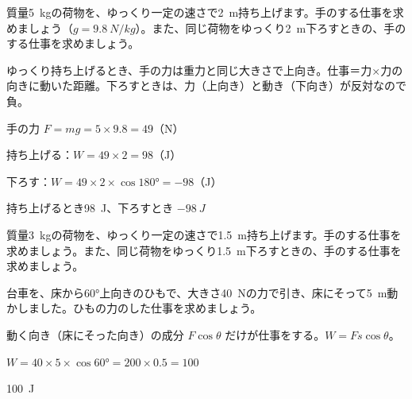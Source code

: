 \begin{kotoba}
\small
{}
\end{kotoba}


\begin{reidai}[持ち上げる仕事]
質量\qty{5}{kg}の荷物を、ゆっくり一定の速さで\qty{2}{m}持ち上げます。手のする仕事を求めましょう（$g=\qty{9.8}{N/kg}$）。また、同じ荷物をゆっくり\qty{2}{m}下ろすときの、手のする仕事を求めましょう。\par
\kangaekata ゆっくり持ち上げるとき、手の力は重力と同じ大きさで上向き。仕事＝力×力の向きに動いた距離。下ろすときは、力（上向き）と動き（下向き）が反対なので負。\par
\shiki 手の力 $F=mg=5\times9.8=49$（N）\par
\hspace*{2.6\zw}持ち上げる：$W=49\times2=98$（J）\par
\hspace*{2.6\zw}下ろす：$W=49\times2\times\cos180°=-98$（J）\par
\kotae 持ち上げるとき\qty{98}{J}、下ろすとき $-\qty{98}{J}$
\end{reidai}

\begin{jibun}
質量\qty{3}{kg}の荷物を、ゆっくり一定の速さで\qty{1.5}{m}持ち上げます。手のする仕事を求めましょう。また、同じ荷物をゆっくり\qty{1.5}{m}下ろすときの、手のする仕事を求めましょう。
\end{jibun}

\begin{reidai}[ななめに引く力の仕事]
台車を、床から60°上向きのひもで、大きさ\qty{40}{N}の力で引き、床にそって\qty{5}{m}動かしました。ひもの力のした仕事を求めましょう。\par
\kangaekata 動く向き（床にそった向き）の成分 $F\cos\theta$ だけが仕事をする。$W=Fs\cos\theta$。\par
\shiki $W=40\times5\times\cos60°=200\times0.5=100$\par
\kotae \qty{100}{J}
\end{reidai}

